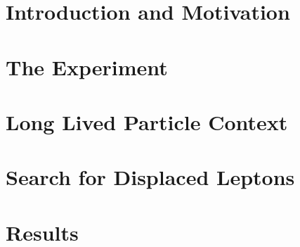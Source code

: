 \documentclass{ucetd}
\begin{document}
\part{Introduction and Motivation}



\cleardoublepage 

\part{The Experiment}






\cleardoublepage 

\part{Long Lived Particle Context}



\cleardoublepage
\part{Search for Displaced Leptons}




\cleardoublepage
\part{Results}





\cleardoublepage 

\printbibliography[heading=bibintoc,title={References}]

%
%
\end{document}
